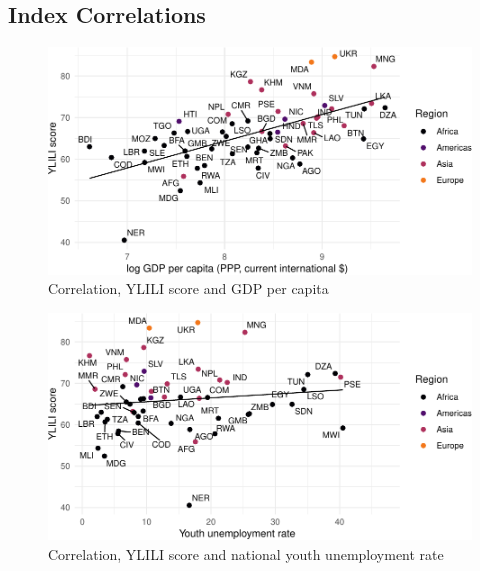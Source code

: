 \documentclass[
  a4paper, twoside, 12pt]{book}
\begin{document}
\hypertarget{correlations}{%
\subsection*{Index Correlations}\label{correlations}}


\begin{figure}[H]

{\centering \includegraphics{figures/fig-indexgdp-1} 

}

\caption{Correlation, YLILI score and GDP per capita}\label{fig:fig-indexgdp}
\end{figure}

\begin{figure}[H]

{\centering \includegraphics{figures/fig-indexunemp-1} 

}

\caption{Correlation, YLILI score and national youth unemployment rate}\label{fig:fig-indexunemp}
\end{figure}
\end{document}
